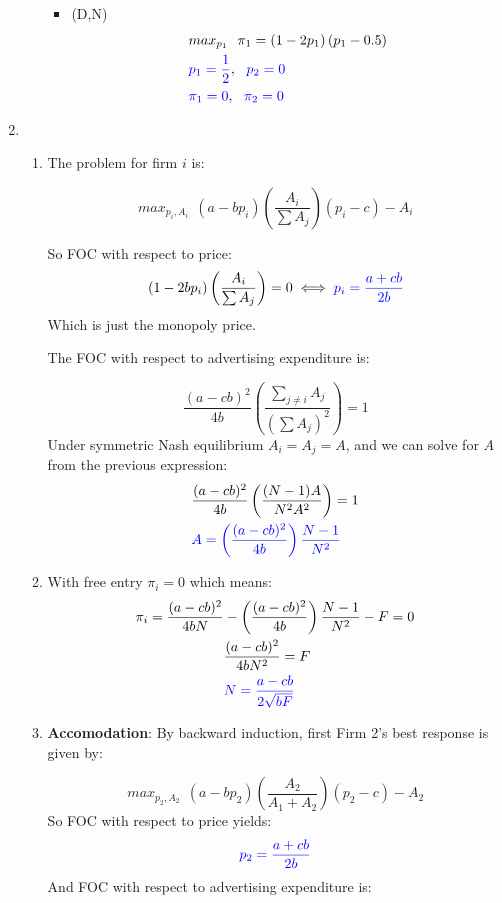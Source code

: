 \documentclass[12pt,english]{article}
\begin{document}
\begin{enumerate}
\begin{enumerate}
\begin{itemize}
\item (D,N)
\begin{align}
&max_{p_{1}}\ \ \pi_{1}=\left(1-2p_{1}\right)(p_{1}-0.5)\nonumber\\
&\textcolor{blue}{p_{1}=\frac{1}{2}}, \ \ \textcolor{blue}{p_{2}=0}\nonumber\\
& \textcolor{blue}{\pi_{1}=0}, \ \ \textcolor{blue}{\pi_{2}=0}\nonumber
\end{align}
\end{itemize}


\end{enumerate}

\item 
\begin{enumerate}
\item The problem for firm $i$ is:

\[
max_{p_{i}, A_{i}} \ \ (a-bp_{i})\left( \frac{A_{i}}{\sum A_{j}}\right)(p_{i}-c)-A_{i}
\]

So FOC with respect to price:
\[
(1-2bp_{i})\left( \frac{A_{i}}{\sum A_{j}}\right)=0\iff \textcolor{blue}{p_{i}=\frac{a+cb}{2b}}
\]
Which is just the monopoly price.

The FOC with respect to advertising expenditure is:

\[
\frac{(a-cb)^{2}}{4b}\left( \frac{\sum_{j\neq i}A_{j}}{(\sum A_{j})^{2}}\right)=1
\]
Under symmetric Nash equilibrium $A_{i}=A_{j}=A$, and we can solve for $A$ from the previous expression:
\begin{align}
&\frac{(a-cb)^{2}}{4b}\left( \frac{(N-1)A}{N^{2}A^{2}}\right)=1\nonumber\\
&\textcolor{blue}{A=\left(\frac{(a-cb)^{2}}{4b}\right)\frac{N-1}{N^{2}}}\nonumber
\end{align}

\item With free entry $\pi_{i}=0$ which means:
\begin{align}
\pi_{i}=\frac{(a-cb)^{2}}{4bN}&-\left(\frac{(a-cb)^{2}}{4b}\right)\frac{N-1}{N^{2}}-F=0\nonumber\\
&\frac{(a-cb)^{2}}{4bN^{2}}=F\nonumber\\
&\textcolor{blue}{N=\frac{a-cb}{2\sqrt{bF}}}\nonumber
\end{align}

\item \textbf{Accomodation}: By backward induction, first Firm 2's best response is given by:

\[
max_{p_{2}, A_{2}}\ \ (a-bp_{2})\left( \frac{A_{2}}{A_{1}+A_{2}}\right)(p_{2}-c)-A_{2}\nonumber
\]
So FOC with respect to price yields:
\[
\textcolor{blue}{p_{2}=\frac{a+cb}{2b}}
\]
And FOC with respect to advertising expenditure is:


\end{enumerate}
\end{enumerate}
\end{document}
